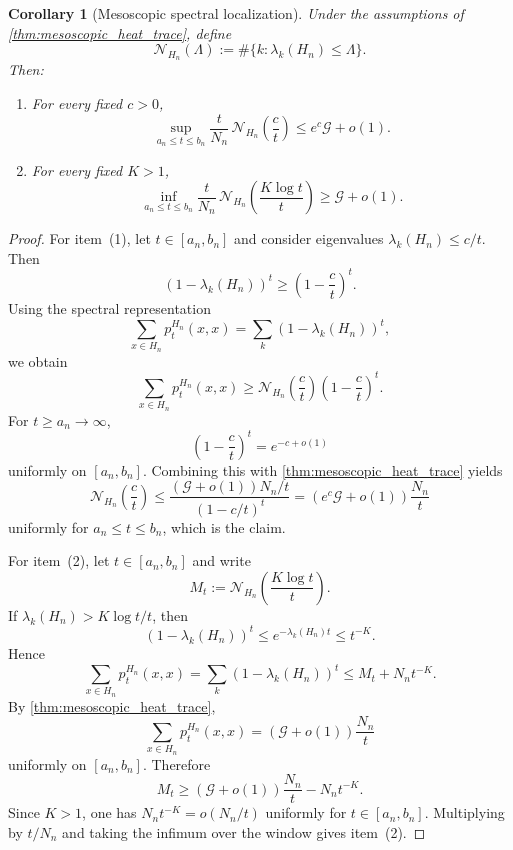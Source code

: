 \documentclass[reqno]{amsart}
\numberwithin{equation}{section}
\newtheorem{corollary}[corollary]{Corollary}
\theoremstyle{definition}
\theoremstyle{remark}
\newcommand{\Cref}[1]{\autoref{#1}}
\newcommand{\cG}{\mathcal{G}}
\begin{document}
\begin{corollary}[Mesoscopic spectral localization]\label{cor:mesoscopic_counting}
Under the assumptions of \Cref{thm:mesoscopic_heat_trace}, define
\[
  \mathcal N_{H_n}(\Lambda):=\#\{k:\lambda_k(H_n)\le \Lambda\}.
\]
Then:
\begin{enumerate}
  \item For every fixed $c>0$,
\[
  \sup_{a_n\le t\le b_n}\frac{t}{N_n}\,\mathcal N_{H_n}\!\left(\frac{c}{t}\right)
  \le e^c \cG + o(1).
\]
  \item For every fixed $K>1$,
\[
  \inf_{a_n\le t\le b_n}\frac{t}{N_n}\,\mathcal N_{H_n}\!\left(\frac{K\log t}{t}\right)
  \ge \cG + o(1).
\]
\end{enumerate}
\end{corollary}

\begin{proof}
For item~(1), let $t\in[a_n,b_n]$ and consider eigenvalues $\lambda_k(H_n)\le c/t$. Then
\[
  (1-\lambda_k(H_n))^t \ge \left(1-\frac{c}{t}\right)^t.
\]
Using the spectral representation
\[
  \sum_{x\in H_n} p_t^{H_n}(x,x)=\sum_k (1-\lambda_k(H_n))^t,
\]
we obtain
\[
  \sum_{x\in H_n} p_t^{H_n}(x,x)
  \ge
  \mathcal N_{H_n}\!\left(\frac{c}{t}\right)\left(1-\frac{c}{t}\right)^t.
\]
For $t\ge a_n\to\infty$,
\[
  \left(1-\frac{c}{t}\right)^t = e^{-c+o(1)}
\]
uniformly on $[a_n,b_n]$. Combining this with \Cref{thm:mesoscopic_heat_trace} yields
\[
  \mathcal N_{H_n}\!\left(\frac{c}{t}\right)
  \le
  \frac{(\cG+o(1))N_n/t}{(1-c/t)^t}
  =
  \left(e^c\cG+o(1)\right)\frac{N_n}{t}
\]
uniformly for $a_n\le t\le b_n$, which is the claim.

For item~(2), let $t\in[a_n,b_n]$ and write
\[
  M_t:=\mathcal N_{H_n}\!\left(\frac{K\log t}{t}\right).
\]
If $\lambda_k(H_n)>K\log t/t$, then
\[
  (1-\lambda_k(H_n))^t \le e^{-\lambda_k(H_n)t}\le t^{-K}.
\]
Hence
\[
  \sum_{x\in H_n} p_t^{H_n}(x,x)
  = \sum_k (1-\lambda_k(H_n))^t
  \le M_t + N_n t^{-K}.
\]
By \Cref{thm:mesoscopic_heat_trace},
\[
  \sum_{x\in H_n} p_t^{H_n}(x,x)
  =
  \left(\cG+o(1)\right)\frac{N_n}{t}
\]
uniformly on $[a_n,b_n]$. Therefore
\[
  M_t
  \ge
  \left(\cG+o(1)\right)\frac{N_n}{t}-N_n t^{-K}.
\]
Since $K>1$, one has $N_n t^{-K}=o(N_n/t)$ uniformly for $t\in[a_n,b_n]$. Multiplying by $t/N_n$ and taking the infimum over the window gives item~(2).
\end{proof}
\end{document}
